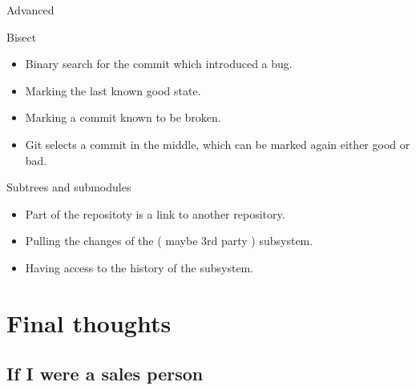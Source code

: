 \documentclass{beamer}
\begin{document}

\begin{frame}{Advanced}

\begin{block}{Bisect}
\begin{itemize}
 \item Binary search for the commit which introduced a bug.
 \item Marking the last known good state.
 \item Marking a commit known to be broken.
 \item Git selects a commit in the middle, which can be marked again either good or bad.
\end{itemize}
\end{block}

\begin{block}{Subtrees and submodules}
\begin{itemize}
  \item Part of the repositoty is a link to another repository.
  \item Pulling the changes of the ( maybe 3rd party ) subsystem.
  \item Having access to the history of the subsystem.
\end{itemize}
\end{block}

\end{frame}


\section{Final thoughts}

\subsection{If I were a sales person}
\end{document}
